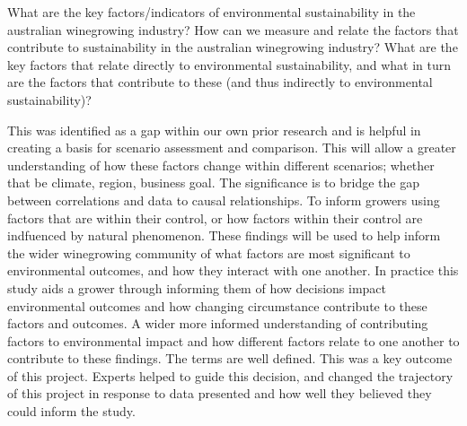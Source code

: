 


%




What are the key factors/indicators of environmental  sustainability in the australian winegrowing industry?
How can we measure and relate the factors that contribute to sustainability in the australian winegrowing industry?
What are the key factors that relate directly to environmental sustainability, and what in turn are the factors that contribute to these (and thus indirectly to environmental sustainability)?

%
This was identified as a gap within our own prior research and is helpful in creating a basis for scenario assessment and comparison. This will allow a greater understanding of how these factors change within different scenarios; whether that be climate, region, business goal.
The significance is to bridge the gap between correlations and data to causal relationships. To inform growers using factors that are within their control, or how factors within their control are indfuenced by natural phenomenon.
These findings will be used to help inform the wider winegrowing community of what factors are most significant to environmental outcomes, and how they interact with one another. In practice this study aids a grower through informing them of how decisions impact environmental outcomes and how changing circumstance contribute to these factors and outcomes.
A wider more informed understanding of contributing factors to environmental impact and how different factors relate to one another to contribute to these findings.
The terms are well defined. This was a key outcome of this project.
Experts helped to guide this decision, and changed the trajectory of this project in response to data presented and how well they believed they could inform the study.

